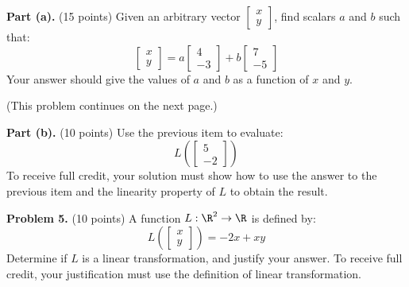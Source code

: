 \documentclass[12pt]{article}
\begin{document}
\textbf{Part (a).} (15 points) Given an arbitrary vector $\begin{bmatrix}x\\y\end{bmatrix}$, find scalars $a$ and $b$ such that:
\[
\begin{bmatrix}x\\y\end{bmatrix}=a\left[\begin{matrix}4\\-3\end{matrix}\right]+b\left[\begin{matrix}7\\-5\end{matrix}\right]
\]
Your answer should give the values of $a$ and $b$ as a function of $x$ and $y$.

\vfill
(This problem continues on the next page.)

\clearpage

\textbf{Part (b).} (10 points) Use the previous item to evaluate:
\[
L\left(\begin{bmatrix}5\\-2\end{bmatrix}\right)
\]
To receive full credit, your solution must show how to use the answer to the previous item and the linearity property of $L$ to obtain the result. 

\clearpage

\textbf{Problem 5.} (10 points) A function $L:\R^2\to\R$ is defined by:
\[
L\left(\begin{bmatrix}x\\y\end{bmatrix}\right)=-2x+xy
\]
Determine if $L$ is a linear transformation, and justify your answer. To receive full credit, your justification must use the definition of linear transformation.
\end{document}
